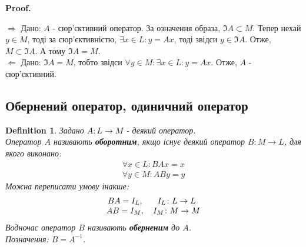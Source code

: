 \documentclass[a4paper, 10pt]{article}
\makeatletter
\def\rightproof{$\boxed{\Rightarrow}$ }
\def\leftproof{$\boxed{\Leftarrow}$ }
\theoremstyle{theoremdd}
\newtheorem{definition}[theorem]{Definition}
\renewenvironment{proof}[1][Proof.\\]{\par
\pushQED{\hfill \qed}%
\normalfont \topsep6\p@\@plus6\p@\relax
\trivlist
\item\relax
{\bfseries
#1\@addpunct{.}}\hspace\labelsep\ignorespaces
}{%
\popQED\endtrivlist\@endpefalse
}
\makeatother
\begin{document}
	\begin{proof}
	\rightproof Дано: $A$ - сюр'єктивний оператор. За означення образа, $\Im A \subset M$. Тепер нехай $y \in M$, тоді за сюр'єктивністю, $\exists x \in L: y = Ax$, тоді звідси $y \in \Im A$. Отже, $M \subset \Im A$. А тому $\Im A = M$.
	\bigskip \\
	\leftproof Дано: $\Im A = M$, тобто звідси $\forall y \in M: \exists x \in L: y = Ax$. Отже, $A$ - сюр'єктивний.
	\end{proof}
	
	\subsection{Обернений оператор, одиничний оператор}
	\begin{definition}
	Задано $A \colon L \to M$ - деякий оператор.\\
	Оператор $A$ називають \textbf{оборотним}, якщо існує деякий оператор $B \colon M \to L$, для якого виконано:
	\begin{align*}
	\forall x \in L: BAx = x \\
	\forall y \in M: ABy = y
	\end{align*}
	Можна переписати умову інакше:
	\begin{align*}
	\begin{tabular}{cc}
	$BA = I_L$, & $I_L \colon L \to L$ \\
	$AB = I_M$, & $I_M \colon M \to M$
	\end{tabular}
	\end{align*}
	Водночас оператор $B$ називають \textbf{оберненим} до $A$.\\
	Позначення: $B = A^{-1}$.
	\end{definition}
	
\end{document}
